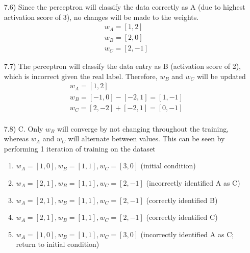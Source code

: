 \documentclass[11pt]{article}
\theoremstyle{definition}
\theoremstyle{remark}
\begin{document}
\begin{enumerate}
\item[7.6)] Since the perceptron will classify the data correctly as A (due to highest activation score of 3), no changes will be made to the weights.
\begin{align*}
w_A = [1,2]\\
w_B = [2,0]\\
w_C = [2,-1]
\end{align*}

\item[7.7)] The perceptron will classify the data entry as B (activation score of 2), which is incorrect given the real label. Therefore, $w_B$ and $w_C$ will be updated
\begin{align*}
w_A = [1,2] \\
w_B = [-1,0] - [-2,1] = [1,-1]\\
w_C = [2,-2] + [-2,1] = [0,-1]\\
\end{align*}

\item[7.8)] C. Only $w_B$ will converge by not changing throughout the training, whereas $w_A$ and $w_C$ will alternate between values. This can be seen by performing 1 iteration of training on the dataset
\begin{enumerate}
\item $w_A = [1,0], w_B = [1,1], w_C = [3,0]$ (initial condition)
\item $w_A = [2,1], w_B = [1,1], w_C = [2,-1]$ (incorrectly identified A as C)
\item $w_A = [2,1], w_B = [1,1], w_C = [2,-1]$ (correctly identified B)
\item $w_A = [2,1], w_B = [1,1], w_C = [2,-1]$ (correctly identified C)
\item $w_A = [1,0], w_B = [1,1], w_C = [3,0]$ (incorrectly identified A as C; return to initial condition)
\end{enumerate}

\end{enumerate}
\end{document}

